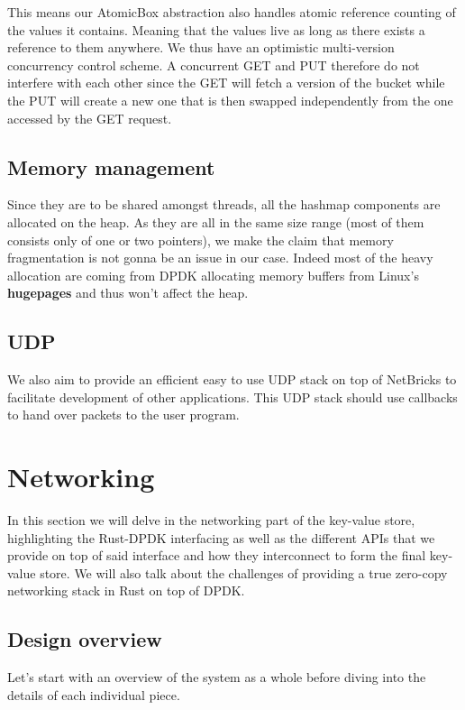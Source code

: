 \documentclass[11pt]{article}
\begin{document}
This means our AtomicBox abstraction also handles atomic reference
counting of the values it contains. Meaning that the values live as
long as there exists a reference to them anywhere. We thus have an
optimistic multi-version concurrency control scheme. A concurrent GET
and PUT therefore do not interfere with each other since the GET will
fetch a version of the bucket while the PUT will create a new one that
is then swapped independently from the one accessed by the GET
request.

\subsection{Memory management}

Since they are to be shared amongst threads, all the hashmap
components are allocated on the heap. As they are  all in the same
size range (most of them consists only of one or two pointers), we
make the claim that memory fragmentation is not gonna be an issue in
our case. Indeed most of the heavy allocation are coming from DPDK
allocating memory buffers from Linux's \textbf{hugepages} and thus
won't affect the heap.

\subsection{UDP}

We also aim to provide an efficient easy to use UDP stack on top of
NetBricks to facilitate development of other applications. This UDP
stack should use callbacks to hand over packets to the user program.

\section{Networking}

In this section we will delve in the networking part of the key-value
store, highlighting the Rust-DPDK interfacing as well as the different
APIs that we provide on top of said interface and how they
interconnect to form the final key-value store. We will also talk
about the challenges of providing a true zero-copy networking stack in
Rust on top of DPDK.

\subsection{Design overview}

Let's start with an overview of the system as a whole before diving
into the details of each individual piece.
\end{document}
